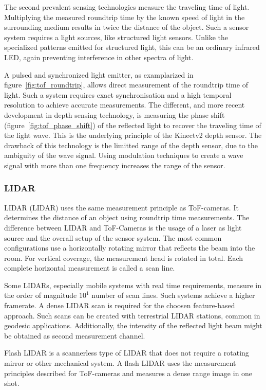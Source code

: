 The second prevalent sensing technologies measure the traveling time of light.
Multiplying the measured roundtrip time by the known speed of light in the surrounding medium results in twice the distance of the object.
Such a sensor system requires a light sources, like structured light sensors.
Unlike the specialized patterns emitted for structured light, this can be an ordinary infrared LED, again preventing interference in other spectra of light.

A pulsed and synchronized light emitter, as examplarized in figure~\ref{fig:tof_roundtrip}, allows direct measurement of the roundtrip time of light.
Such a system requires exact synchronisation and a high temporal resolution to achieve accurate measurements.
The different, and more recent development in depth sensing technology, is measuring the phase shift (figure~\ref{fig:tof_phase_shift}) of the reflected light to recover the traveling time of the light wave.
This is the underlying principle of the Kinectv2 depth sensor.
The drawback of this technology is the limitted range of the depth sensor, due to the ambiguity of the wave signal.
Using modulation techniques to create a wave signal with more than one frequency increases the range of the sensor.

\subsubsection{\acrlong{LIDAR}}

\acrlong{LIDAR} (\acrshort{LIDAR}) uses the same measurement principle as \acrshort{ToF}-cameras.
It determines the distance of an object using roundtrip time measurements.
The difference between \acrshort{LIDAR} and \acrshort{ToF}-Cameras is the usage of a \acrshort{laser} as light source and the overall setup of the sensor system.
The most common configurations use a horizontally rotating mirror that reflects the beam into the room.
For vertical coverage, the measurement head is rotated in total.
Each complete horizontal measurement is called a scan line.

Some \acrshort{LIDAR}s, especially mobile systems with real time requirements, measure in the order of magnitude $10^1$ number of scan lines.
Such systems achieve a higher framerate.
A dense \acrshort{LIDAR} scan is required for the choosen feature-based approach.
Such scans can be created with terrestrial \acrshort{LIDAR} stations, common in geodesic applications.
Additionally, the intensity of the reflected light beam might be obtained as second measurement channel.

Flash \acrshort{LIDAR} is a scannerless type of \acrshort{LIDAR} that does not require a rotating mirror or other mechanical system.
A flash \acrshort{LIDAR} uses the measurement principles described for \acrshort{ToF}-cameras and measures a dense range image in one shot.
